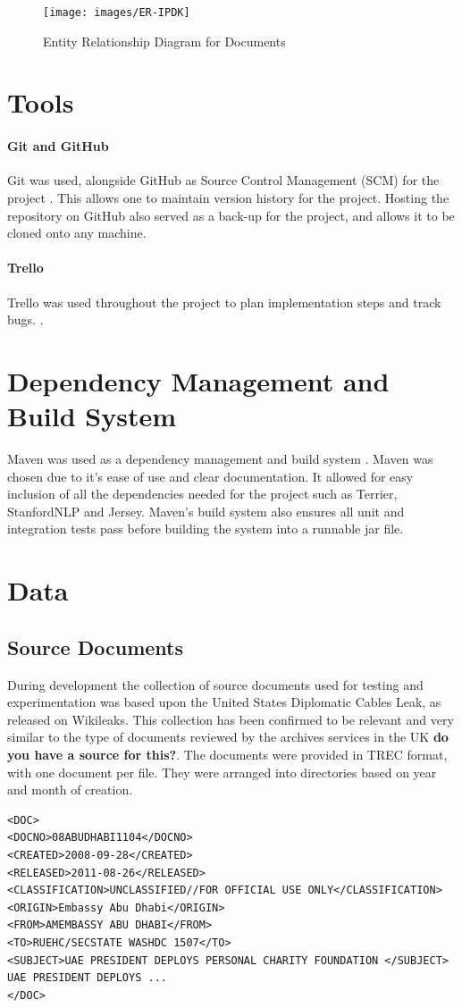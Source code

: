 \documentclass{l4proj}
\begin{document}
\begin{figure}[H]
\centering
\texttt{[image: images/ER-IPDK]}
\caption{Entity Relationship Diagram for Documents}
\label{er}
\end{figure}

\section{Tools}
\paragraph{Git and GitHub}
Git was used, alongside GitHub as Source Control Management (SCM) for the project \cite{git} \cite{github}. This allows one to maintain version history for the project. Hosting the repository on GitHub also served as a back-up for the project, and allows it to be cloned onto any machine.
\paragraph{Trello}
Trello was used throughout the project to plan implementation steps and track bugs. \cite{trello}.
\section{Dependency Management and Build System}
Maven was used as a dependency management and build system \cite{maven}. Maven was chosen due to it's ease of use and clear documentation. It allowed for easy inclusion of all the dependencies needed for the project such as Terrier, StanfordNLP and Jersey. Maven's build system also ensures all unit and integration tests pass before building the system into a runnable jar file.

\section{Data}
\subsection{Source Documents}
During development the collection of source documents used for testing and experimentation was based upon the United States Diplomatic Cables Leak, as released on Wikileaks. This collection has been confirmed to be relevant and very similar to the type of documents reviewed by the archives services in the UK \textbf{do you have a source for this?}. The documents were provided in TREC format, with one document per file. They were arranged into directories based on year and month of creation.
\begin{verbatim}
<DOC>
<DOCNO>08ABUDHABI1104</DOCNO>
<CREATED>2008-09-28</CREATED>
<RELEASED>2011-08-26</RELEASED>
<CLASSIFICATION>UNCLASSIFIED//FOR OFFICIAL USE ONLY</CLASSIFICATION>
<ORIGIN>Embassy Abu Dhabi</ORIGIN>
<FROM>AMEMBASSY ABU DHABI</FROM>
<TO>RUEHC/SECSTATE WASHDC 1507</TO>
<SUBJECT>UAE PRESIDENT DEPLOYS PERSONAL CHARITY FOUNDATION </SUBJECT>
UAE PRESIDENT DEPLOYS ...
</DOC>
\end{verbatim}
\end{document}
